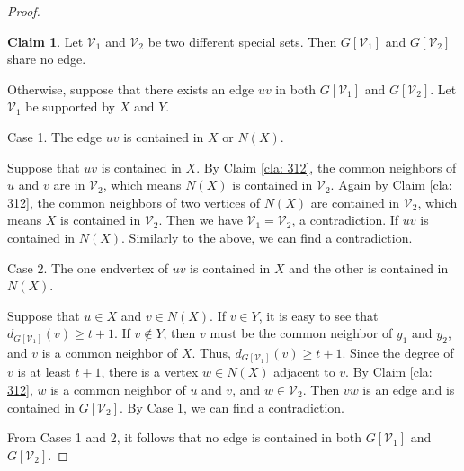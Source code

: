 \documentclass[11pt,a4paper]{article}
\theoremstyle{definition}
\newtheorem{claimthm}{Claim}[section]
\newenvironment{claimproof}
  {\renewcommand{\qedsymbol}{\ensuremath{\blacksquare}}\proof}
  {\endproof}
  {\endproof}
\begin{document}
\begin{proof}
        \begin{claimthm}\label{cla: 313}
            Let $\mathcal{V}_1$ and $\mathcal{V}_2$ be two different special sets. Then $G[\mathcal{V}_1]$ and $G[\mathcal{V}_2]$ share no edge.
        \end{claimthm}
        \begin{claimproof}
        Otherwise, suppose that there exists an edge $uv$ in both $G[\mathcal{V}_1]$ and $G[\mathcal{V}_2]$.
        Let $\mathcal{V}_1$ be supported by $X$ and $Y$.

        Case 1. The edge $uv$ is contained in $X$ or $N(X)$.

        Suppose that $uv$ is contained in $X$.
        By Claim \ref{cla: 312}, the common neighbors of $u$ and $v$ are in $\mathcal{V}_2$, which means $N(X)$ is contained in $\mathcal{V}_2$.
        Again by Claim \ref{cla: 312}, the common neighbors of two vertices of $N(X)$ are contained in $\mathcal{V}_2$, which means $X$ is contained in $\mathcal{V}_2$.
        Then we have $\mathcal{V}_1 = \mathcal{V}_2$, a contradiction.
        If $uv$ is contained in $N(X)$.
        Similarly to the above, we can find a contradiction.

        Case 2. The one endvertex of $uv$ is contained in $X$ and the other is contained in $N(X)$.

        Suppose that $u \in X$ and $v \in N(X)$.
        If $v \in Y$, it is easy to see that $d_{G[\mathcal{V}_1]}(v) \geq t+1$.
        If $v \notin Y$, then $v$ must be the common neighbor of $y_1$ and $y_2$, and $v$ is a common neighbor of $X$.
        Thus, $d_{G[\mathcal{V}_1]}(v) \geq t+1$.
        Since the degree of $v$ is at least $t+1$, there is a vertex $w \in N(X)$ adjacent to $v$.
        By Claim \ref{cla: 312}, $w$ is a common neighbor of $u$ and $v$, and $w \in \mathcal{V}_2$.
        Then $vw$ is an edge and is contained in $G[\mathcal{V}_2]$.
        By Case 1, we can find a contradiction.

        From Cases 1 and 2, it follows that no edge is contained in both $G[\mathcal{V}_1]$ and $G[\mathcal{V}_2]$.
        \end{claimproof}


\end{proof}
\end{document}
